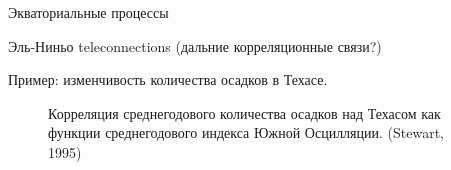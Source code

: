 \begin{chapter}{Экваториальные процессы}
\begin{section}{Эль-Ниньо teleconnections (дальние корреляционные связи?)}
\begin{paragraph}{Пример: изменчивость количества осадков в Техасе.}
\begin{figure}[t!]
\begin{centering}
\end{centering}
\caption{Корреляция среднегодового количества осадков над Техасом 
как функции среднегодового индекса Южной Осцилляции. 
(Stewart, 1995)}
\label{fig:texasrain}
\end{figure}
%
%
\end{paragraph}
\end{section}


\end{chapter}
